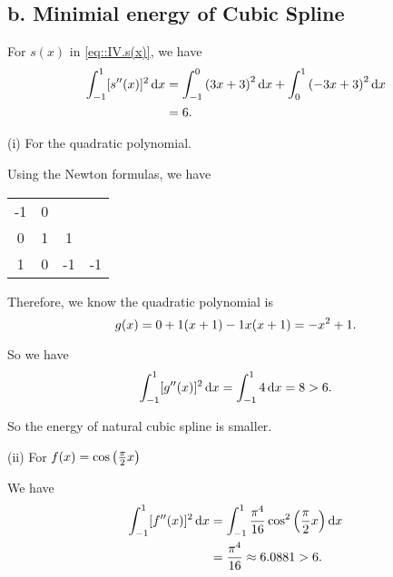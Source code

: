 \documentclass[a4paper]{article}
\begin{document}
\subsection*{b. Minimial energy of Cubic Spline}

For $s(x)$ in \eqref{eq::IV.s(x)}, we have
\begin{equation}
    \begin{aligned}
        \int_{-1}^{1} [s ^{\prime \prime} \qty(x)]^2 \,\mathrm{d}x &= \int_{-1}^{0} \qty(3x+3)^2 \,\mathrm{d}x + \int_{0}^{1} \qty(-3x+3)^2 \,\mathrm{d}x \\
        &= 6. 
    \end{aligned}
\end{equation} 

(i) For the quadratic polynomial.

Using the Newton formulas, we have
\begin{table}[H]
    \centering  
    \begin{tabular}{c|ccc}
    -1 & 0 &    & \\
    0  & 1 & 1  & \\
    1  & 0 & -1 & -1 \\
    \end{tabular}
\end{table} 

Therefore, we know the quadratic polynomial is 
\begin{equation}
    g(x) = 0 + 1 \qty(x+1) -1 x \qty(x+1) = -x^2 + 1.\\
\end{equation}

So we have
\begin{equation}
    \int_{-1}^{1} [g ^{\prime \prime} \qty(x)]^2 \,\mathrm{d}x = \int_{-1}^{1} 4 \,\mathrm{d}x = 8 > 6.
\end{equation}

So the energy of natural cubic spline is smaller. 

(ii) For $f(x) = \cos\qty(\frac{\pi}{2}x)$

We have
\begin{equation}
    \begin{aligned}
        \int_{-1}^{1} [f ^{\prime \prime} \qty(x)]^2 \,\mathrm{d}x &= \int_{-1}^{1} \frac{\pi ^4}{16} \cos^2\qty(\frac{\pi}{2} x) \,\mathrm{d}x \\
        &= \frac{\pi ^4}{16} \approx 6.0881 > 6.
    \end{aligned}
\end{equation}
\end{document}
